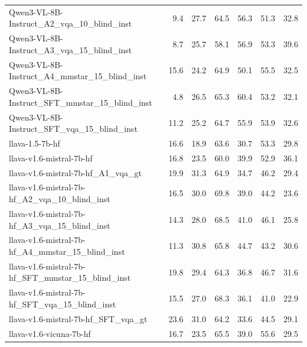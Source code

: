 \begin{tabular}{lrrrrrr}
Qwen3-VL-8B-Instruct_A2_vqa_10_blind_inst & 9.4 & 27.7 & 64.5 & 56.3 & 51.3 & 32.8 \\
Qwen3-VL-8B-Instruct_A3_vqa_15_blind_inst & 8.7 & 25.7 & 58.1 & 56.9 & 53.3 & 39.6 \\
Qwen3-VL-8B-Instruct_A4_mmstar_15_blind_inst & 15.6 & 24.2 & 64.9 & 50.1 & 55.5 & 32.5 \\
Qwen3-VL-8B-Instruct_SFT_mmstar_15_blind_inst & 4.8 & 26.5 & 65.3 & 60.4 & 53.2 & 32.1 \\
Qwen3-VL-8B-Instruct_SFT_vqa_15_blind_inst & 11.2 & 25.2 & 64.7 & 55.9 & 53.9 & 32.6 \\
llava-1.5-7b-hf & 16.6 & 18.9 & 63.6 & 30.7 & 53.3 & 29.8 \\
llava-v1.6-mistral-7b-hf & 16.8 & 23.5 & 60.0 & 39.9 & 52.9 & 36.1 \\
llava-v1.6-mistral-7b-hf_A1_vqa_gt & 19.9 & 31.3 & 64.9 & 34.7 & 46.2 & 29.4 \\
llava-v1.6-mistral-7b-hf_A2_vqa_10_blind_inst & 16.5 & 30.0 & 69.8 & 39.0 & 44.2 & 23.6 \\
llava-v1.6-mistral-7b-hf_A3_vqa_15_blind_inst & 14.3 & 28.0 & 68.5 & 41.0 & 46.1 & 25.8 \\
llava-v1.6-mistral-7b-hf_A4_mmstar_15_blind_inst & 11.3 & 30.8 & 65.8 & 44.7 & 43.2 & 30.6 \\
llava-v1.6-mistral-7b-hf_SFT_mmstar_15_blind_inst & 19.8 & 29.4 & 64.3 & 36.8 & 46.7 & 31.6 \\
llava-v1.6-mistral-7b-hf_SFT_vqa_15_blind_inst & 15.5 & 27.0 & 68.3 & 36.1 & 41.0 & 22.9 \\
llava-v1.6-mistral-7b-hf_SFT_vqa_gt & 23.6 & 31.0 & 64.2 & 33.6 & 44.5 & 29.1 \\
llava-v1.6-vicuna-7b-hf & 16.7 & 23.5 & 65.5 & 39.0 & 55.6 & 29.5 \\
\bottomrule
\end{tabular}
